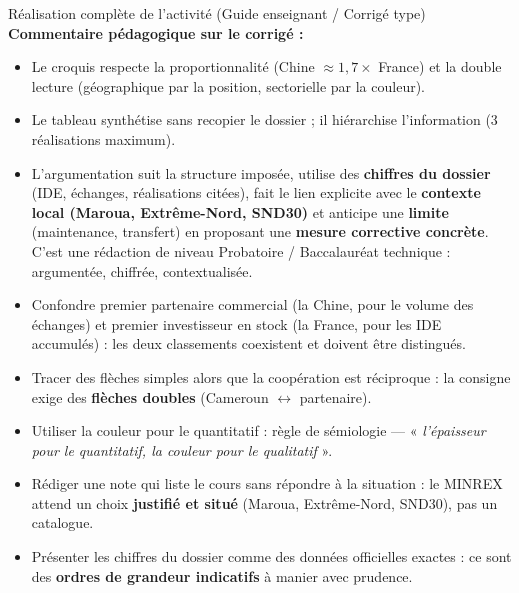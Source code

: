 \documentclass[11pt]{article}
\newcommand{\cle}[1]{{\popxbold\color{popdark}#1}}
\begin{document}
\begin{exoresolu}{Réalisation complète de l'activité (Guide enseignant / Corrigé type)}
\medskip
\noindent \textbf{Commentaire pédagogique sur le corrigé :}
\begin{itemize}
    \item Le croquis respecte la proportionnalité (Chine $\approx 1{,}7 \times$ France) et la double lecture (géographique par la position, sectorielle par la couleur).
    \item Le tableau synthétise sans recopier le dossier ; il hiérarchise l'information (3 réalisations maximum).
    \item L'argumentation suit la structure imposée, utilise des \textbf{chiffres du dossier} (IDE, échanges, réalisations citées), fait le lien explicite avec le \textbf{contexte local (Maroua, Extrême-Nord, SND30)} et anticipe une \textbf{limite} (maintenance, transfert) en proposant une \textbf{mesure corrective concrète}. C'est une rédaction de niveau Probatoire / Baccalauréat technique : argumentée, chiffrée, contextualisée.
\end{itemize}
\end{exoresolu}

\begin{attention}
\begin{itemize}
    \item Confondre \cle{premier partenaire commercial} (la Chine, pour le volume des échanges) et \cle{premier investisseur en stock} (la France, pour les IDE accumulés) : les deux classements coexistent et doivent être distingués.
    \item Tracer des flèches simples alors que la coopération est réciproque : la consigne exige des \textbf{flèches doubles} (Cameroun $\leftrightarrow$ partenaire).
    \item Utiliser la couleur pour le quantitatif : règle de sémiologie — « \textit{l'épaisseur pour le quantitatif, la couleur pour le qualitatif} ».
    \item Rédiger une note qui liste le cours sans répondre à la situation : le MINREX attend un choix \textbf{justifié et situé} (Maroua, Extrême-Nord, SND30), pas un catalogue.
    \item Présenter les chiffres du dossier comme des données officielles exactes : ce sont des \textbf{ordres de grandeur indicatifs} à manier avec prudence.
\end{itemize}
\end{attention}
\end{document}
